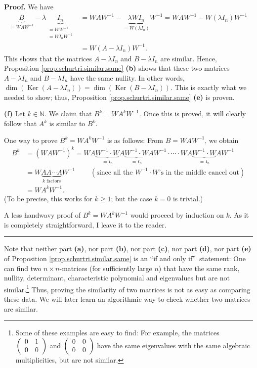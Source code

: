 \documentclass[numbers=enddot,12pt,final,onecolumn,notitlepage]{scrartcl}%
\numberwithin{exer}{subsection}
\theoremstyle{definition}
\newenvironment{proof}[1][Proof]{\noindent\textbf{#1.} }{\ \rule{0.5em}{0.5em}}
\begin{document}
\begin{proof}
We have%
\begin{align*}
\underbrace{B}_{=WAW^{-1}}-\lambda\underbrace{I_{n}}_{\substack{=WW^{-1}%
\\=WI_{n}W^{-1}}}  &  =WAW^{-1}-\underbrace{\lambda WI_{n}}_{=W\left(  \lambda
I_{n}\right)  }W^{-1}=WAW^{-1}-W\left(  \lambda I_{n}\right)  W^{-1}\\
&  =W\left(  A-\lambda I_{n}\right)  W^{-1}.
\end{align*}
This shows that the matrices $A-\lambda I_{n}$ and $B-\lambda I_{n}$ are
similar. Hence, Proposition \ref{prop.schurtri.similar.same} \textbf{(b)}
shows that these two matrices $A-\lambda I_{n}$ and $B-\lambda I_{n}$ have the
same nullity. In other words, $\dim\left(  \operatorname*{Ker}\left(
A-\lambda I_{n}\right)  \right)  =\dim\left(  \operatorname*{Ker}\left(
B-\lambda I_{n}\right)  \right)  $. This is exactly what we needed to show;
thus, Proposition \ref{prop.schurtri.similar.same} \textbf{(e)} is proven.

\textbf{(f)} Let $k\in\mathbb{N}$. We claim that $B^{k}=WA^{k}W^{-1}$. Once
this is proved, it will clearly follow that $A^{k}$ is similar to $B^{k}$.

One way to prove $B^{k}=WA^{k}W^{-1}$ is as follows: From $B=WAW^{-1}$, we
obtain%
\begin{align*}
B^{k}  &  =\left(  WAW^{-1}\right)  ^{k}=WA\underbrace{W^{-1}\cdot W}_{=I_{n}%
}A\underbrace{W^{-1}\cdot W}_{=I_{n}}AW^{-1}\cdot\cdots\cdot
WA\underbrace{W^{-1}\cdot W}_{=I_{n}}AW^{-1}\\
&  =W\underbrace{AA\cdots A}_{k\text{ factors}}W^{-1}%
\ \ \ \ \ \ \ \ \ \ \left(  \text{since all the }W^{-1}\cdot W\text{'s in the
middle cancel out}\right) \\
&  =WA^{k}W^{-1}.
\end{align*}
(To be precise, this works for $k\geq1$; but the case $k=0$ is trivial.)

A less handwavy proof of $B^{k}=WA^{k}W^{-1}$ would proceed by induction on
$k$. As it is completely straightforward, I leave it to the reader.
\end{proof}

Note that neither part \textbf{(a)}, nor part \textbf{(b)}, nor part
\textbf{(c)}, nor part \textbf{(d)}, nor part \textbf{(e)} of Proposition
\ref{prop.schurtri.similar.same} is an \textquotedblleft if and only
if\textquotedblright\ statement: One can find two $n\times n$-matrices (for
sufficiently large $n$) that have the same rank, nullity, determinant,
characteristic polynomial and eigenvalues but are not similar.\footnote{Some
of these examples are easy to find: For example, the matrices $\left(
\begin{array}
[c]{cc}%
0 & 1\\
0 & 0
\end{array}
\right)  $ and $\left(
\begin{array}
[c]{cc}%
0 & 0\\
0 & 0
\end{array}
\right)  $ have the same eigenvalues with the same algebraic multiplicities,
but are not similar.} Thus, proving the similarity of two matrices is not as
easy as comparing these data. We will later learn an algorithmic way to check
whether two matrices are similar.
\end{document}
